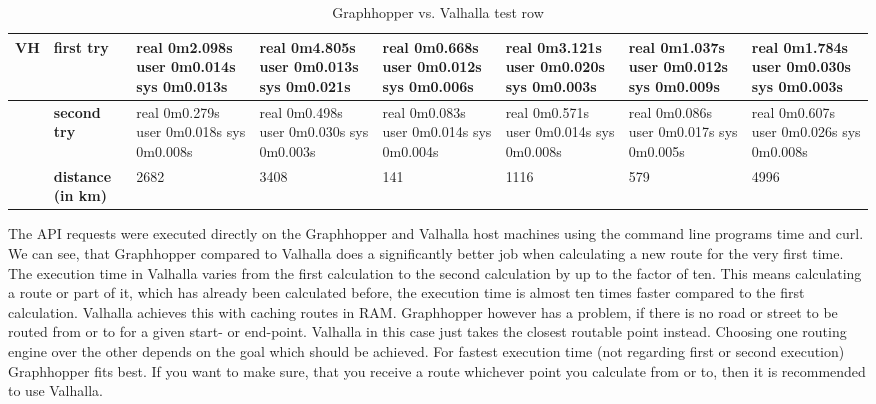 \begin{table}
\begin{tabular}[H]{@{}p{0.5cm}|p{1.5cm}|p{2.3cm}|p{2.3cm}|p{2.3cm}|p{2.3cm}|p{2.3cm}|p{2.3cm}}
\multirow{3}{*}{\textbf{VH}}    & \textbf{first try}        & real 0m2.098s user 0m0.014s sys 0m0.013s & real 0m4.805s user 0m0.013s sys 0m0.021s & real 0m0.668s user 0m0.012s sys 0m0.006s & real 0m3.121s user 0m0.020s sys 0m0.003s & real 0m1.037s user 0m0.012s sys 0m0.009s & real 0m1.784s user 0m0.030s sys 0m0.003s \\ \hline
                                       & \textbf{second try}       & real 0m0.279s user 0m0.018s sys 0m0.008s & real 0m0.498s user 0m0.030s sys 0m0.003s & real 0m0.083s user 0m0.014s sys 0m0.004s & real 0m0.571s user 0m0.014s sys 0m0.008s & real 0m0.086s user 0m0.017s sys 0m0.005s & real 0m0.607s user 0m0.026s sys 0m0.008s \\ \hline
                                       & \textbf{distance (in km)} & 2682 & 3408 & 141 & 1116 & 579 & 4996 %
\end{tabular}
\caption{Graphhopper vs. Valhalla test row \label{GHvsVH}}
\end{table}

The API requests were executed directly on the Graphhopper and Valhalla host machines using the command line programs time and curl.
We can see, that Graphhopper compared to Valhalla does a significantly better job when calculating a new route for the very first time. The execution time in Valhalla varies from the first calculation to the second calculation by up to the factor of ten. This means calculating a route or part of it, which has already been calculated before, the execution time is almost ten times faster compared to the first calculation. Valhalla achieves this with caching routes in RAM. Graphhopper however has a problem, if there is no road or street to be routed from or to for a given start- or end-point. Valhalla in this case just takes the closest routable point instead.  Choosing one routing engine over the other depends on the goal which should be achieved. For fastest execution time (not regarding first or second execution) Graphhopper fits best. If you want to make sure, that you receive a route whichever point you calculate from or to, then it is recommended to use Valhalla.

